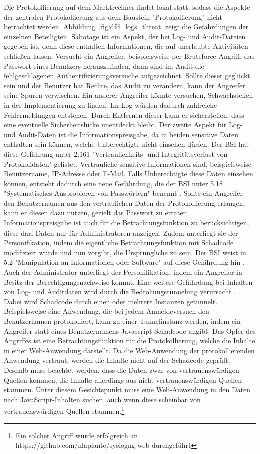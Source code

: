 \documentclass[11pt,a4paper]{report}
\begin{document}
Die Protokollierung auf dem Marktrechner findet lokal statt, sodass die Aspekte der zentralen Protokollierung aus dem Baustein "Protokollierung" nicht betrachtet werden. Abbildung~\ref{fig:dfd_logs_threat} zeigt die Gefährdungen der einzelnen Beteiligten. Sabotage ist ein Aspekt, der bei Log- und Audit-Dateien gegeben ist, denn diese enthalten Informationen, die auf unerlaubte Aktivitäten schließen lassen. Versucht ein Angreifer, beispielsweise per Bruteforce-Angriff, das Passwort eines Benutzers herauszufinden, dann sind im Audit die fehlgeschlagenen Authentifizierungsversuche aufgezeichnet. Sollte dieser geglückt sein und der Benutzer hat Rechte, das Audit zu verändern, kann der Angreifer seine Spuren verwischen. Ein anderer Angreifer könnte versuchen, Schwachstellen in der Implementierung zu finden. Im Log würden dadurch zahlreiche Fehlermeldungen entstehen. Durch Entfernen dieser kann er sicherstellen, dass eine eventuelle Sicherheitslücke unentdeckt bleibt. Der zweite Aspekt für Log- und Audit-Daten ist die Informationspreisgabe, da in beiden sensitive Daten enthalten sein können, welche Unberechtigte nicht einsehen dürfen. Der BSI hat diese Gefährung unter 2.161 "Vertraulichkeits- und Integritätsverlust von Protokolldaten" \cite{bsi_g2161} gelistet. Vertrauliche sensitive Informationen sind, beispielsweise Benutzername, IP-Adresse oder E-Mail. Falls Unberechtigte diese Daten einsehen können, entsteht dadurch eine neue Gefährdung, die der BSI unter 5.18 "Systematisches Ausprobieren von Passwörtern" benennt \cite{bsi_g5018}. Sollte ein Angreifer den Benutzernamen aus den vertraulichen Daten der Protokollierung erlangen, kann er diesen dazu nutzen, gezielt das Passwort zu erraten. Informationspreisgabe ist auch für die Betrachtungsfunktion zu berücksichtigen, diese darf Daten nur für Administratoren anzeigen. Zudem unterliegt sie der Personifikation, indem die eigentliche Betrachtungsfunktion mit Schadcode modifiziert wurde und nun vorgibt, die Ursprüngliche zu sein. Der BSI weist in 5.2 "Manipulation an Informationen oder Software" auf diese Gefährdung hin \cite{bsi_g5002}. Auch der Administrator unterliegt der Personifikation, indem ein Angreifer in Besitz der Berechtigungsnachweise kommt. Eine weitere Gefährdung bei Inhalten von Log- und Auditdaten wird durch die Bedrohungstunnelung verursacht \cite[s.~265]{gutmann}. Dabei wird Schadcode durch einen oder mehrere Instanzen getunnelt. Beispielsweise eine Anwendung, die bei jedem Anmeldeversuch den Benutzernamen protokolliert, kann zu einer Tunnelinstanz werden, indem ein Angreifer statt eines Benutzernamens Javascript-Schadcode angibt. Das Opfer des Angriffes ist eine Betrachtungsfunktion für die Protokollierung, welche die Inhalte in einer Web-Anwendung darstellt. Da die Web-Anwendung der protokollierenden Anwendung vertraut, werden die Inhalte nicht auf der Schadcode geprüft. Deshalb muss beachtet werden, dass die Daten zwar von vertrauenswürdigen Quellen kommen, die Inhalte allerdings aus nicht vertrauenswürdigen Quellen stammen. Unter diesem Gesichtspunkt muss eine Web-Anwendung in den Daten nach JavaScript-Inhalten suchen, auch wenn diese scheinbar von vertrauenswürdigen Quellen stammen.\footnote{Ein solcher Angriff wurde erfolgreich an https://github.com/nlaplante/syslogng-web durchgeführt}
\end{document}
